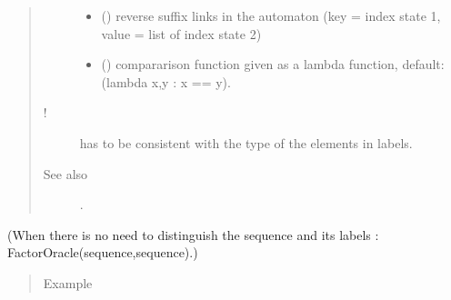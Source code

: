\documentclass[letterpaper,10pt,english]{sphinxmanual}
\begin{document}
\begin{fulllineitems}
\begin{quote}
\begin{description}
\begin{itemize}
\item {} 
 () \textendash{} reverse suffix links in the automaton (key = index state 1, value = list of index state 2)

\item {} 
 () \textendash{} compararison function given as a lambda function, default: (lambda x,y : x == y).

\end{itemize}

\item[{!}] \leavevmode
{} has to be consistent with the type of the elements in labels.

\item[{See also}] \leavevmode
{} .

\end{description}\end{quote}

(When there is no need to distinguish the sequence and its labels : FactorOracle(sequence,sequence).)
\begin{quote}\begin{description}
\item[{Example}] \leavevmode
\end{description}\end{quote}


\end{fulllineitems}
\end{document}
